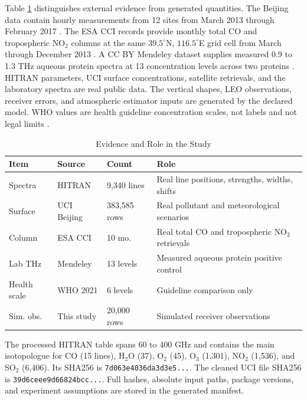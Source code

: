 \documentclass[conference]{IEEEtran}
\begin{document}
Table \ref{tab:evidence} distinguishes external evidence from generated quantities. The Beijing data contain hourly measurements from 12 sites from March 2013 through February 2017 \cite{chen2017beijing}. The ESA CCI records provide monthly total CO and tropospheric NO$_2$ columns at the same $39.5^\circ$N, $116.5^\circ$E grid cell from March through December 2013 \cite{esacciCO,esacciNO2}. A CC BY Mendeley dataset supplies measured 0.9 to 1.3 THz aqueous protein spectra at 13 concentration levels across two proteins \cite{hattori2024data}. HITRAN parameters, UCI surface concentrations, satellite retrievals, and the laboratory spectra are real public data. The vertical shapes, LEO observations, receiver errors, and atmospheric estimator inputs are generated by the declared model. WHO values are health guideline concentration scales, not labels and not legal limits \cite{who2021aqg}.

\begin{table}[t]
\caption{Evidence and Role in the Study}
\label{tab:evidence}
\centering
\scriptsize
\setlength{\tabcolsep}{2.0pt}
\begin{tabular}{@{}p{0.95cm}p{1.35cm}p{0.96cm}p{2.99cm}@{}}
\toprule
Item & Source & Count & Role \\
\midrule
Spectra & HITRAN & 9,340 lines & Real line positions, strengths, widths, shifts \\
Surface & UCI Beijing & 383,585 rows & Real pollutant and meteorological scenarios \\
Column & ESA CCI & 10 mo. & Real total CO and tropospheric NO$_2$ retrievals \\
Lab THz & Mendeley & 13 levels & Measured aqueous protein positive control \\
Health scale & WHO 2021 & 6 levels & Guideline comparison only \\
Sim. obs. & This study & 20,000 rows & Simulated receiver observations \\
\bottomrule
\end{tabular}
\end{table}

The processed HITRAN table spans 60 to 400 GHz and contains the main isotopologue for CO (15 lines), H$_2$O (37), O$_2$ (45), O$_3$ (1,301), NO$_2$ (1,536), and SO$_2$ (6,406). Its SHA256 is \texttt{7d063e4036da3d3e5...}. The cleaned UCI file SHA256 is \texttt{39d6ceee9d66824bcc...}. Full hashes, absolute input paths, package versions, and experiment assumptions are stored in the generated manifest.
\end{document}
